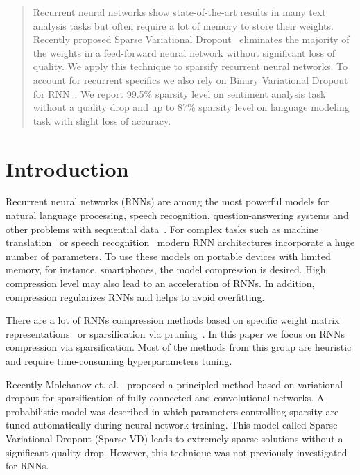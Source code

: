 \documentclass{article}
\begin{document}
\printAffiliationsAndNotice{\icmlEqualContribution} %

\begin{abstract} 
Recurrent neural networks show state-of-the-art results in many text analysis tasks but often require a lot of memory to store their weights. Recently proposed Sparse Variational Dropout~\cite{dmolch} eliminates the majority of the weights in a feed-forward neural network without significant loss of quality. We apply this technique to sparsify recurrent neural networks. To account for recurrent specifics we also rely on Binary Variational Dropout for RNN~\cite{gal}. We report 99.5\% sparsity level on sentiment analysis task without a quality drop and up to 87\% sparsity level on language modeling task with slight loss of accuracy.
\end{abstract} 

\section{Introduction}
\label{intro}
Recurrent neural networks (RNNs) are among the most powerful models for natural language processing, speech recognition, question-answering systems and other problems with sequential data~\cite{las,deepspeech,hypernet,trans,qa}. For complex tasks such as machine translation~\cite{trans} or speech recognition~\cite{deepspeech} modern RNN architectures incorporate a huge number of parameters. To use these models on portable devices with limited memory, for instance, smartphones, the model compression is desired. High compression level may also lead to an acceleration of RNNs. In addition, compression regularizes RNNs and helps to avoid overfitting.

There are a lot of RNNs compression methods based on specific weight matrix representations~\cite{tjandra,kroneker} or sparsification via pruning~\cite{pruning}. In this paper we focus on RNNs compression via sparsification. Most of the methods from this group are heuristic and require time-consuming hyperparameters tuning.

Recently Molchanov et. al.~ proposed a principled method based on variational dropout for sparsification of fully connected and convolutional networks. A probabilistic model was described in which parameters controlling sparsity are tuned automatically during neural network training. This model called Sparse Variational Dropout (Sparse VD) leads to extremely sparse solutions without a significant quality drop. However, this technique was not previously investigated for RNNs.
\end{document}
